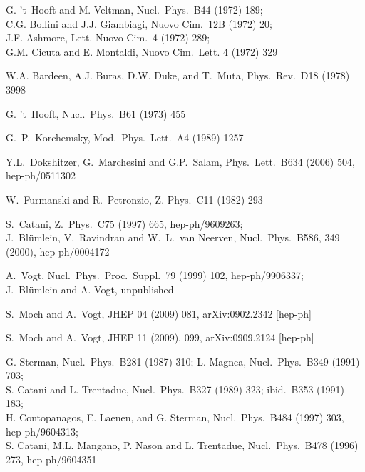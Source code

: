 \documentclass[12pt]{article}
\begin{document}
{\begin{thebibliography}{10}
G. 't~Hooft and M. Veltman, Nucl.\ Phys.\ B44 (1972) 189; \\
C.G. Bollini and J.J. Giambiagi, Nuovo Cim.\ 12B (1972) 20; \\
J.F. Ashmore, Lett. Nuovo Cim.\ 4 (1972) 289; \\
G.M. Cicuta and E. Montaldi, Nuovo Cim.\ Lett. 4 (1972) 329

W.A. Bardeen, A.J. Buras, D.W. Duke, and T.~Muta,
  Phys.\ Rev.\ D18 (1978) 3998

G. 't~Hooft,
  Nucl.\ Phys.\ B61 (1973) 455

G.~P.~Korchemsky,
  Mod.\ Phys.\ Lett.\ A4 (1989) 1257

Y.L.~Dokshitzer, G.~Marchesini and G.P.~Salam,
 Phys.\ Lett.\ B634 (2006) 504, hep-ph/0511302

W.\ Furmanski and R.\ Petronzio, Z. Phys.\ C11 (1982) 293

S.~Catani,
  Z.\ Phys.\ C75 (1997) 665, hep-ph/9609263; \\
J.~Bl\"umlein, V.~Ravindran and W.~L.~van Neerven,
  Nucl.\ Phys.\  B586, 349 (2000), hep-ph/0004172

A.~Vogt,
  Nucl.\ Phys.\ Proc.\ Suppl.\ 79 (1999) 102, hep-ph/9906337; \\
J.~Bl\"umlein and A. Vogt, unpublished

S.~Moch and A.~Vogt,
  JHEP 04 (2009) 081, arXiv:0902.2342 [hep-ph]

S.~Moch and A.~Vogt,
  JHEP 11 (2009), 099, arXiv:0909.2124 [hep-ph] 

G. Sterman, Nucl.\ Phys.\ B281 (1987) 310; 
L. Magnea, Nucl.\ Phys.\ B349 (1991) 703;\\
S. Catani and L. Trentadue, Nucl.\ Phys.\ B327 (1989) 323; 
  ibid.\ B353 (1991) 183;\\
H. Contopanagos, E. Laenen, and G. Sterman, 
  Nucl.\ Phys.\ B484 (1997) 303, hep-ph/9604313; \\
S. Catani, M.L. Mangano, P. Nason and L. Trentadue,
  Nucl.\ Phys.\ B478 (1996) 273, hep-ph/9604351


\end{thebibliography}}
\end{document}
